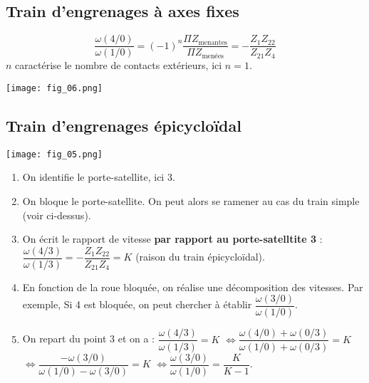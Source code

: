 \subsection{Train d'engrenages à axes fixes}


\begin{resultat}
$$
\dfrac{\omega(4/0)}{\omega(1/0)}= (-1)^n \dfrac{\Pi Z_{\text{menantes}}}{\Pi Z_{\text{menées}}}=-\dfrac{Z_1Z_{22}}{Z_{21}Z_4}
$$
$n$ caractérise le nombre de contacts extérieurs, ici $n=1$.
\end{resultat}


\begin{marginfigure}[-4cm]
\texttt{[image: fig\_06.png]}
\end{marginfigure}



\subsection{Train d'engrenages épicycloïdal}
\begin{marginfigure}
\texttt{[image: fig\_05.png]}
\end{marginfigure}

\begin{methode}
\begin{enumerate}
\item On identifie le porte-satellite, ici 3.
\item On bloque le porte-satellite. On peut alors se ramener au cas du train simple (voir ci-dessus). 
\item On écrit le rapport de vitesse \textbf{par rapport au porte-satelltite 3} :$
\dfrac{\omega(4/3)}{\omega(1/3)}=-\dfrac{Z_1Z_{22}}{Z_{21}Z_4} = K
$ (raison du train épicycloïdal).
\item En fonction de la roue bloquée, on réalise une décomposition des vitesses. Par exemple, Si 4 est bloquée, on   peut chercher à établir $\dfrac{\omega(3/0)}{\omega(1/0)}$. 
\item On repart du point 3 et on a : $\dfrac{\omega(4/3)}{\omega(1/3)}= K$
$\Leftrightarrow \dfrac{\omega(4/0)+\omega(0/3)}{\omega(1/0)+\omega(0/3)}= K$
$\Leftrightarrow \dfrac{-\omega(3/0)}{\omega(1/0)-\omega(3/0)}= K$
$\Leftrightarrow \dfrac{\omega(3/0)}{\omega(1/0)} = \dfrac{K}{K-1}$.
\end{enumerate}
\end{methode}
%
